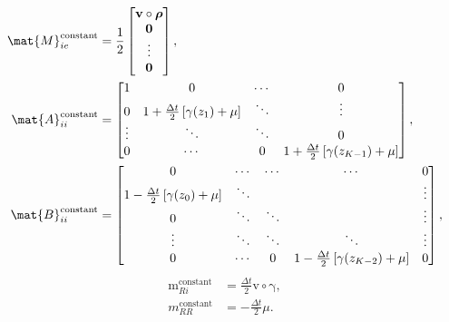 \documentclass{jpmarticle}
\renewcommand{\vec}[1]{\boldsymbol{\mathrm{#1}}}
\begin{document}
\begin{equation}
  \begin{split}
    \mat{M}_{ie}^{\text{constant}} &=
    \frac{1}{2}
    \begin{bmatrix}
      \vec{v} \circ \vec{\rho}
      \\
      \vec{0}
      \\
      \vdots
      \\
      \vec{0}
    \end{bmatrix},
    \\
    \mat{A}_{ii}^{\text{constant}} &=
    \begin{bmatrix}
      1 & 0 & \cdots & 0
      \\
      0 & 1 + \frac{\Delta t}{2} \left[\gamma(z_1) + \mu\right] &
      \ddots & \vdots
      \\
      \vdots & \ddots & \ddots & 0
      \\
      0 & \cdots & 0 &
      1 + \frac{\Delta t}{2} \left[\gamma(z_{K - 1}) + \mu\right]
    \end{bmatrix},
    \\
    \mat{B}_{ii}^{\text{constant}} &=
    \begin{bmatrix}
      0 & \cdots & \cdots & \cdots & 0
      \\
      1 - \frac{\Delta t}{2} \left[\gamma(z_0) + \mu\right] & \ddots &
      & & \vdots
      \\
      0 & \ddots & \ddots & & \vdots
      \\
      \vdots & \ddots & \ddots & \ddots & \vdots
      \\
      0 & \cdots & 0 &
      1 - \frac{\Delta t}{2} \left[\gamma(z_{K - 2}) + \mu\right] & 0
    \end{bmatrix},
  \end{split}
\end{equation}
\begin{equation}
  \begin{split}
    \vec{m}_{Ri}^{\text{constant}} &=
    \frac{\Delta t}{2} \vec{v} \circ \vec{\gamma},
    \\
    m_{RR}^{\text{constant}} &=
    - \frac{\Delta t}{2} \mu.
  \end{split}
\end{equation}
\end{document}
